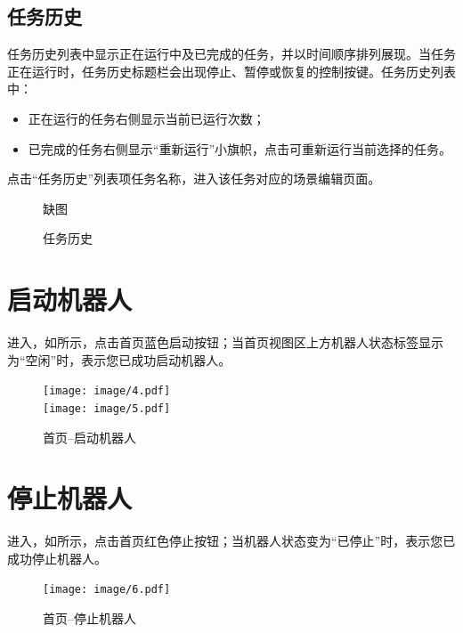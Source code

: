 \subsection{任务历史}
\label{sec:任务历史}
任务历史列表中显示正在运行中及已完成的任务，并以时间顺序排列展现。当任务正在运行时，任务历史标题栏会出现停止、暂停或恢复的控制按键。任务历史列表中：
\begin{itemize}
	\item 正在运行的任务右侧显示当前已运行次数；
	\item 已完成的任务右侧显示“重新运行”小旗帜，点击可重新运行当前选择的任务。
\end{itemize}

 	
点击“任务历史”列表项任务名称，进入该任务对应的场景编辑页面。

\begin{figure}[ht]
	\centering
	\color{red}缺图
	\caption{任务历史}
	\label{fig:任务历史}
\end{figure}

\section{启动机器人}
进入\LM ，如所示，点击首页蓝色启动按钮；当首页视图区上方机器人状态标签显示为“空闲”时，表示您已成功启动机器人。

\begin{figure}[ht]
	\centering
	\texttt{[image: image/4.pdf]}\\
	\texttt{[image: image/5.pdf]}
	\caption{\LM  首页--启动机器人}
	\label{fig:启动机器人}
\end{figure}

\section{停止机器人}
进入\LM ，如所示，点击首页红色停止按钮；当机器人状态变为“已停止”时，表示您已成功停止机器人。

\begin{figure}[ht]
	\centering
	\texttt{[image: image/6.pdf]}
	\caption{\LM  首页--停止机器人}
	\label{fig:停止机器人}
\end{figure}

